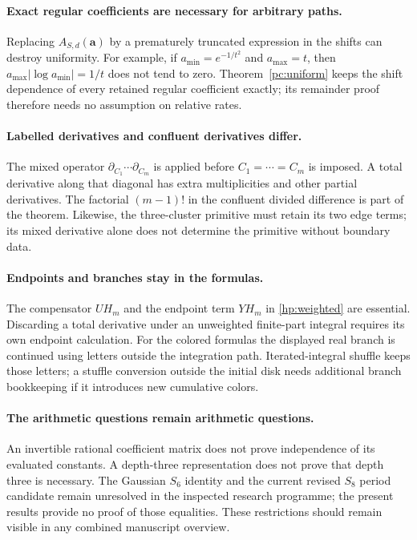 \paragraph{Exact regular coefficients are necessary for arbitrary paths.}
Replacing $A_{S,d}(\boldsymbol a)$ by a prematurely truncated expression
in the shifts can destroy uniformity. For example, if
$a_{\min}=e^{-1/t^2}$ and $a_{\max}=t$, then
$a_{\max}|\log a_{\min}|=1/t$ does not tend to zero.
Theorem~\ref{pc:uniform} keeps the shift dependence of every retained
regular coefficient exactly; its remainder proof therefore needs no
assumption on relative rates.

\paragraph{Labelled derivatives and confluent derivatives differ.}
The mixed operator $\partial_{C_1}\cdots\partial_{C_m}$ is applied
before $C_1=\cdots=C_m$ is imposed. A total derivative along that
diagonal has extra multiplicities and other partial derivatives.
The factorial $(m-1)!$ in the confluent divided difference is part
of the theorem. Likewise, the three-cluster primitive must retain
its two edge terms; its mixed derivative alone does not determine
the primitive without boundary data.

\paragraph{Endpoints and branches stay in the formulas.}
The compensator $UH_m$ and the endpoint term $YH_m$ in
\eqref{hp:weighted} are essential. Discarding a total derivative
under an unweighted finite-part integral requires its own endpoint
calculation. For the colored formulas the displayed real branch is
continued using letters outside the integration path. Iterated-integral
shuffle keeps those letters; a stuffle conversion outside the initial
disk needs additional branch bookkeeping if it introduces new
cumulative colors.

\paragraph{The arithmetic questions remain arithmetic questions.}
An invertible rational coefficient matrix does not prove independence
of its evaluated constants. A depth-three representation does not
prove that depth three is necessary. The Gaussian $S_6$ identity and
the current revised $S_8$ period candidate remain unresolved in the
inspected research programme; the present results provide no proof of
those equalities. These restrictions should remain visible in any
combined manuscript overview.

